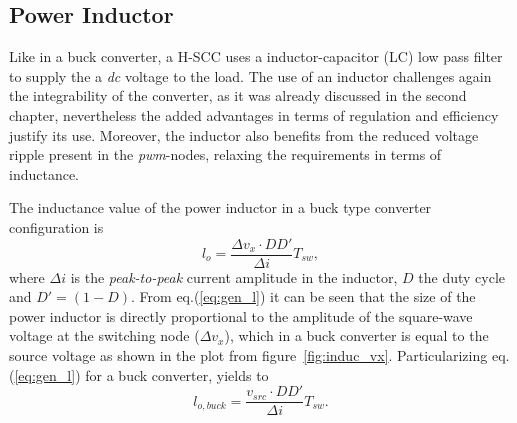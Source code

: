 \subsection{Power Inductor}
\label{ch:power_inductor}

Like in a buck converter, a H-SCC uses a inductor-capacitor (LC) low pass filter to supply the a \emph{dc} voltage to the load. The use of an inductor challenges again the integrability of the converter, as it was already discussed in the second chapter, nevertheless the added advantages in terms of regulation and efficiency justify its use. Moreover, the inductor also benefits from the reduced voltage ripple present in the \emph{pwm}-nodes, relaxing the requirements in terms of inductance.


The inductance value of the power inductor in a buck type converter configuration is
\begin{equation}
 l_{o}   = \frac{\Delta v_{x} \cdot DD'}{\Delta i} T_{sw},
\label{eq:gen_l}
\end{equation}
where $\Delta i$ is the \emph{peak-to-peak} current amplitude in the inductor, $D$ the duty cycle and $D'=(1-D)$. From eq.(\ref{eq:gen_l}) it can be seen that the size of the power inductor is directly proportional to the amplitude of the square-wave voltage at the switching node ($\Delta v_x$), which in a buck converter is equal to the source voltage as shown in the plot from figure~\ref{fig:induc_vx}. Particularizing eq.(\ref{eq:gen_l}) for a buck converter, yields to
\begin{equation}
 l_{o,buck}  = \frac{v_{src} \cdot DD'}{\Delta i} T_{sw}.
\label{eq:buck_l}
\end{equation}

